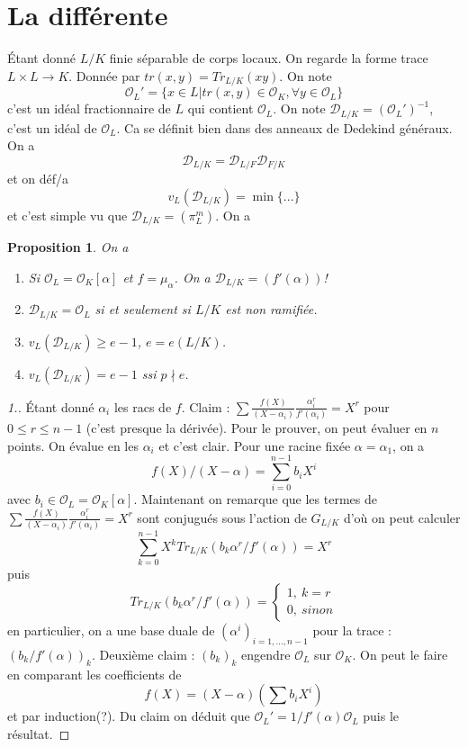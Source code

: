 \documentclass[a4paper,12pt]{book}
\newcommand{\Or}{\mathcal{O}}
\newcommand{\D}{\mathscr{D}}
\theoremstyle{plain}
\newtheorem{prop}{Proposition}
\theoremstyle{definition}
\theoremstyle{remark}
\begin{document}
\section{La différente}
Étant donné $L/K$ finie séparable de corps locaux. On regarde
la forme trace $L\times L\to K$. Donnée par $tr(x,y)=Tr_{L/K}(xy)$.
On note
\[\Or_L'=\{x\in L| tr(x,y)\in\Or_K,\forall y\in \Or_L\}\]
c'est un idéal fractionnaire de $L$ qui contient $\Or_L$.
On note $\D_{L/K}=(\Or_L')^{-1}$, c'est un idéal de $\Or_L$.
Ca se définit bien dans des anneaux de Dedekind généraux.
On a 
\[\D_{L/K}=\D_{L/F}\D_{F/K}\]
et on déf/a
\[v_L(\D_{L/K})=\min\{\ldots\}\]
et c'est simple vu que $\D_{L/K}=(\pi_L^m)$.
On a 
\begin{prop}
    On a 
    \begin{enumerate}
        \item Si $\Or_L=\Or_K[\alpha]$ et $f=\mu_\alpha$.
    On a $\D_{L/K}=(f'(\alpha))$!
        \item $\D_{L/K}=\Or_L$ si et seulement si $L/K$ est
    non ramifiée.
        \item $v_L(\D_{L/K})\geq e-1$, $e=e(L/K)$.
        \item $v_L(\D_{L/K})=e-1$ ssi $p\nmid e$.
    \end{enumerate}
\end{prop}
\begin{proof}[1.]
    Étant donné $\alpha_i$ les racs de $f$. Claim :
    $\sum \frac{f(X)}{(X-\alpha_i)}\frac{ \alpha_i^r}{f'(\alpha_i)}=X^r$
    pour $0\leq r\leq n-1$ (c'est presque la dérivée). Pour le prouver,
    on peut évaluer en $n$ points. On évalue en les $\alpha_i$ et c'est clair.
    Pour une racine fixée $\alpha=\alpha_1$, on a 
    \[f(X)/(X-\alpha)=\sum_{i=0}^{n-1} b_i X^i\]
    avec $b_i\in \Or_L=\Or_K[\alpha]$. Maintenant on remarque
    que les termes de
    $\sum \frac{f(X)}{(X-\alpha_i)}\frac{ \alpha_i^r}{f'(\alpha_i)}=X^r$
    sont conjugués sous l'action de $G_{L/K}$ d'où on peut calculer
    \[\sum_{k=0}^{n-1} X^kTr_{L/K}(b_k\alpha^r/f'(\alpha))=X^r\]
    puis
    \[Tr_{L/K}(b_k\alpha^r/f'(\alpha))=\begin{cases}1,~k=r\\0,~sinon\end{cases}\]
    en particulier, on a une base duale de $(\alpha^i)_{i=1,\ldots,n-1}$ pour
    la trace : $(b_k/f'(\alpha))_k$. Deuxième claim : $(b_k)_k$ engendre $\Or_L$
    sur $\Or_K$. On peut le faire en comparant les coefficients de
    \[f(X)=(X-\alpha)(\sum b_i X^i)\]
    et par induction(?). Du claim on déduit que $\Or_L'=1/f'(\alpha)\Or_L$ puis
    le résultat.
\end{proof}
\end{document}
